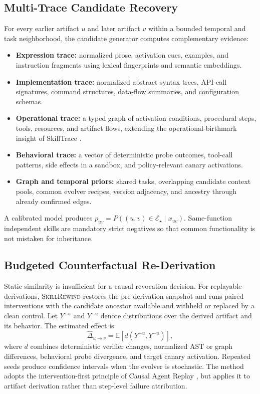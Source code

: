 \documentclass[11pt]{article}
\newcommand{\system}{\textsc{SkillRewind}\xspace}
\newcommand{\edges}{\mathcal{E}}
\begin{document}
\subsection{Multi-Trace Candidate Recovery}
For every earlier artifact $u$ and later artifact $v$ within a bounded temporal and task neighborhood, the candidate generator computes complementary evidence:
\begin{itemize}
\item \textbf{Expression trace:} normalized prose, activation cues, examples, and instruction fragments using lexical fingerprints and semantic embeddings.
\item \textbf{Implementation trace:} normalized abstract syntax trees, API-call signatures, command structures, data-flow summaries, and configuration schemas.
\item \textbf{Operational trace:} a typed graph of activation conditions, procedural steps, tools, resources, and artifact flows, extending the operational-birthmark insight of SkillTrace \citep{skilltrace2026}.
\item \textbf{Behavioral trace:} a vector of deterministic probe outcomes, tool-call patterns, side effects in a sandbox, and policy-relevant canary activations.
\item \textbf{Graph and temporal priors:} shared tasks, overlapping candidate context pools, common evolver recipes, version adjacency, and ancestry through already confirmed edges.
\end{itemize}
A calibrated model produces $p_{uv}=P((u,v)\in\edges_{\star}\mid x_{uv})$. Same-function independent skills are mandatory strict negatives so that common functionality is not mistaken for inheritance.

\subsection{Budgeted Counterfactual Re-Derivation}
Static similarity is insufficient for a causal revocation decision. For replayable derivations, \system restores the pre-derivation snapshot and runs paired interventions with the candidate ancestor available and withheld or replaced by a clean control. Let $Y^{+u}$ and $Y^{-u}$ denote distributions over the derived artifact and its behavior. The estimated effect is
\[
\widehat{\Delta}_{u\rightarrow v}=\mathbb{E}\left[d(Y^{+u},Y^{-u})\right],
\]
where $d$ combines deterministic verifier changes, normalized AST or graph differences, behavioral probe divergence, and target canary activation. Repeated seeds produce confidence intervals when the evolver is stochastic. The method adopts the intervention-first principle of Causal Agent Replay \citep{causalreplay2026}, but applies it to artifact derivation rather than step-level failure attribution.
\end{document}
